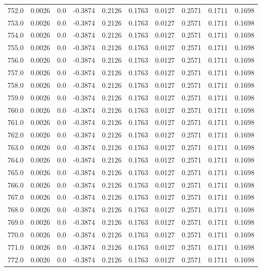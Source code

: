 \begin{longtable}{lrrrrrrrrr}
752.0 & 0.0026 & 0.0 & -0.3874 & 0.2126 & 0.1763 & 0.0127 & 0.2571 & 0.1711 & 0.1698 \\
753.0 & 0.0026 & 0.0 & -0.3874 & 0.2126 & 0.1763 & 0.0127 & 0.2571 & 0.1711 & 0.1698 \\
754.0 & 0.0026 & 0.0 & -0.3874 & 0.2126 & 0.1763 & 0.0127 & 0.2571 & 0.1711 & 0.1698 \\
755.0 & 0.0026 & 0.0 & -0.3874 & 0.2126 & 0.1763 & 0.0127 & 0.2571 & 0.1711 & 0.1698 \\
756.0 & 0.0026 & 0.0 & -0.3874 & 0.2126 & 0.1763 & 0.0127 & 0.2571 & 0.1711 & 0.1698 \\
757.0 & 0.0026 & 0.0 & -0.3874 & 0.2126 & 0.1763 & 0.0127 & 0.2571 & 0.1711 & 0.1698 \\
758.0 & 0.0026 & 0.0 & -0.3874 & 0.2126 & 0.1763 & 0.0127 & 0.2571 & 0.1711 & 0.1698 \\
759.0 & 0.0026 & 0.0 & -0.3874 & 0.2126 & 0.1763 & 0.0127 & 0.2571 & 0.1711 & 0.1698 \\
760.0 & 0.0026 & 0.0 & -0.3874 & 0.2126 & 0.1763 & 0.0127 & 0.2571 & 0.1711 & 0.1698 \\
761.0 & 0.0026 & 0.0 & -0.3874 & 0.2126 & 0.1763 & 0.0127 & 0.2571 & 0.1711 & 0.1698 \\
762.0 & 0.0026 & 0.0 & -0.3874 & 0.2126 & 0.1763 & 0.0127 & 0.2571 & 0.1711 & 0.1698 \\
763.0 & 0.0026 & 0.0 & -0.3874 & 0.2126 & 0.1763 & 0.0127 & 0.2571 & 0.1711 & 0.1698 \\
764.0 & 0.0026 & 0.0 & -0.3874 & 0.2126 & 0.1763 & 0.0127 & 0.2571 & 0.1711 & 0.1698 \\
765.0 & 0.0026 & 0.0 & -0.3874 & 0.2126 & 0.1763 & 0.0127 & 0.2571 & 0.1711 & 0.1698 \\
766.0 & 0.0026 & 0.0 & -0.3874 & 0.2126 & 0.1763 & 0.0127 & 0.2571 & 0.1711 & 0.1698 \\
767.0 & 0.0026 & 0.0 & -0.3874 & 0.2126 & 0.1763 & 0.0127 & 0.2571 & 0.1711 & 0.1698 \\
768.0 & 0.0026 & 0.0 & -0.3874 & 0.2126 & 0.1763 & 0.0127 & 0.2571 & 0.1711 & 0.1698 \\
769.0 & 0.0026 & 0.0 & -0.3874 & 0.2126 & 0.1763 & 0.0127 & 0.2571 & 0.1711 & 0.1698 \\
770.0 & 0.0026 & 0.0 & -0.3874 & 0.2126 & 0.1763 & 0.0127 & 0.2571 & 0.1711 & 0.1698 \\
771.0 & 0.0026 & 0.0 & -0.3874 & 0.2126 & 0.1763 & 0.0127 & 0.2571 & 0.1711 & 0.1698 \\
772.0 & 0.0026 & 0.0 & -0.3874 & 0.2126 & 0.1763 & 0.0127 & 0.2571 & 0.1711 & 0.1698 \\

\end{longtable}

